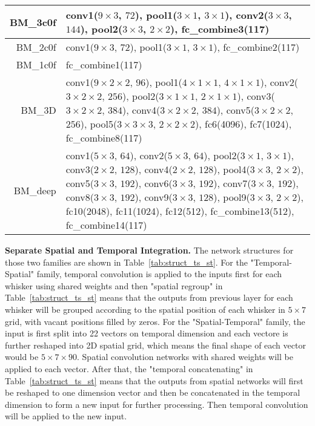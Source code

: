 \begin{table}[h]
\begin{tabularx}{\textwidth}{r|X}
\hline
BM\_3c0f & conv1($9\times3$, $72$), pool1($3\times1$, $3\times1$), conv2($3\times3$, $144$), pool2($3\times3$, $2\times2$), fc\_combine3(117)\\
\hline
BM\_2c0f & conv1($9\times3$, $72$), pool1($3\times1$, $3\times1$), fc\_combine2(117)\\
\hline
BM\_1c0f & fc\_combine1(117)\\
\hline
BM\_3D & conv1($9\times2\times2$, $96$), pool1($4\times1\times1$, $4\times1\times1$), conv2($3\times2\times2$, $256$), pool2($3\times1\times1$, $2\times1\times1$), conv3($3\times2\times2$, $384$), conv4($3\times2\times2$, $384$), conv5($3\times2\times2$, $256$), pool5($3\times3\times3$, $2\times2\times2$), fc6(4096), fc7(1024), fc\_combine8(117)\\
\hline
BM\_deep & conv1($5\times3$, $64$), conv2($5\times3$, $64$), pool2($3\times1$, $3\times1$), conv3($2\times2$, $128$), conv4($2\times2$, $128$), pool4($3\times3$, $2\times2$), conv5($3\times3$, $192$), conv6($3\times3$, $192$), conv7($3\times3$, $192$), conv8($3\times3$, $192$), conv9($3\times3$, $128$), pool9($3\times3$, $2\times2$), fc10(2048), fc11(1024), fc12(512), fc\_combine13(512), fc\_combine14(117)\\
\hline
\end{tabularx}
\label{tab:struct_bm}
\end{table}

\textbf{Separate Spatial and Temporal Integration.} The network structures for those two families are shown in Table~\ref{tab:struct_ts_st}. 
For the "Temporal-Spatial" family, temporal convolution is applied to the inputs first for each whisker using shared weights and then "spatial regroup" in Table~\ref{tab:struct_ts_st} means that the outputs from previous layer for each whisker will be grouped according to the spatial position of each whisker in $5\times7$ grid, with vacant positions filled by zeros.
For the "Spatial-Temporal" family, the input is first split into 22 vectors on temporal dimension and each vectore is further reshaped into 2D spatial grid, which means the final shape of each vector would be $5\times7\times90$.
Spatial convolution networks with shared weights will be applied to each vector.
After that, the "temporal concatenating" in Table~\ref{tab:struct_ts_st} means that the outputs from spatial networks will first be reshaped to one dimension vector and then be concatenated in the temporal dimension to form a new input for further processing. 
Then temporal convolution will be applied to the new input.

